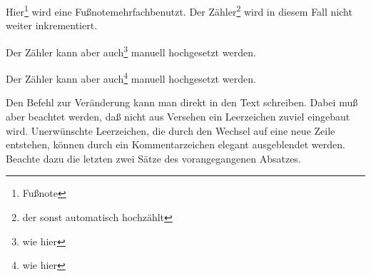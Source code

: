 \documentclass[a5paper]{article}
\begin{document}
Hier\footnote{Fußnote} wird eine Fußnote\footnotemark[1] mehrfach\footnotemark[1]
benutzt. Der Zähler\footnote{der sonst automatisch hochzählt} wird in diesem
Fall nicht weiter inkrementiert.

\setcounter{footnote}{33}

Der Zähler kann aber auch\footnote{wie hier} manuell hochgesetzt 
\setcounter{footnote}{26}
werden.

Der Zähler kann aber auch\footnote{wie hier} manuell hochgesetzt 
\setcounter{footnote}{22}%
werden.

\medskip

Den Befehl zur Veränderung kann man direkt in den Text schreiben.
Dabei muß aber beachtet werden, daß nicht aus Versehen ein Leerzeichen
zuviel eingebaut wird. Unerwünschte Leerzeichen, die durch den
Wechsel auf eine neue Zeile entstehen, können durch ein Kommentarzeichen
elegant ausgeblendet werden. Beachte dazu die letzten zwei Sätze
des vorangegangenen Absatzes.
\end{document}
